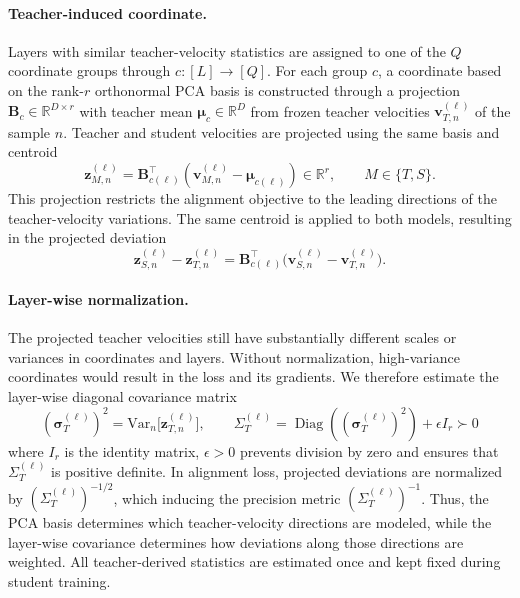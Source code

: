 \documentclass{article}
\newcommand{\R}{\mathbb{R}}
\newcommand{\Var}{\mathrm{Var}}
\newcommand{\Diag}{\operatorname{Diag}}
\newcommand{\bB}{\boldsymbol{B}}
\newcommand{\bz}{\boldsymbol{z}}
\newcommand{\bv}{\boldsymbol{v}}
\newcommand{\bmu}{\boldsymbol{\mu}}
\newcommand{\bsigma}{\boldsymbol{\sigma}}
\newcommand{\bSigma}{\varSigma}
\newcommand{\bI}{I}
\theoremstyle{plain}
\theoremstyle{definition}
\theoremstyle{remark}
\begin{document}
\paragraph{Teacher-induced coordinate.}
Layers with similar teacher-velocity statistics are assigned to one of the $Q$ coordinate groups through $c:[L]\to[Q]$. For each group $c$, a coordinate based on the rank-$r$ orthonormal PCA basis is constructed through a projection $\bB_c\in\R^{D\times r}$ with teacher mean $\bmu_c\in\R^D$ from frozen teacher velocities $\bv_{T,n}^{(\ell)}$ of the sample $n$. Teacher and student velocities are projected using the same basis and centroid
\begin{equation} \label{eq:proj}
  \bz_{M,n}^{(\ell)} = \bB_{c(\ell)}^{\top} (\bv_{M,n}^{(\ell)} - \bmu_{c(\ell)}
  ) \in\R^r, \qquad M\in\{T,S\}.
\end{equation}
This projection restricts the alignment objective to the leading directions of the teacher-velocity variations. The same centroid is applied to both models, resulting in the projected deviation
\[ \bz_{S,n}^{(\ell)} - \bz_{T,n}^{(\ell)} = \bB_{c(\ell)}^{\top} \bigl(\bv_{S,n}^{(\ell)} - \bv_{T,n}^{(\ell)} \bigr). \]

\paragraph{Layer-wise normalization.}
The projected teacher velocities still have substantially different scales or variances in coordinates and layers. Without normalization, high-variance coordinates would result in the loss and its gradients. We therefore estimate the layer-wise diagonal covariance matrix
\begin{equation}
  (\bsigma_T^{(\ell)})^2 = \Var_n \bigl[\bz_{T,n}^{(\ell)} \bigr], \qquad \bSigma_T^{(\ell)} = \Diag ((\bsigma_T^{(\ell)})^2 ) + \epsilon\bI_r \succ 0
  \label{eq:teacher-covariance}
\end{equation}
where $\bI_r$ is the identity matrix, $\epsilon>0$ prevents division by zero and ensures that $\bSigma_T^{(\ell)}$ is positive definite. In alignment loss, projected deviations are normalized by $(\bSigma_T^{(\ell)})^{-1/2}$, which inducing the precision metric $(\bSigma_T^{(\ell)})^{-1}$. Thus, the PCA basis determines which teacher-velocity directions are modeled, while the layer-wise covariance determines how deviations along those directions are weighted. All teacher-derived statistics are estimated once and kept fixed during student training.
\end{document}
